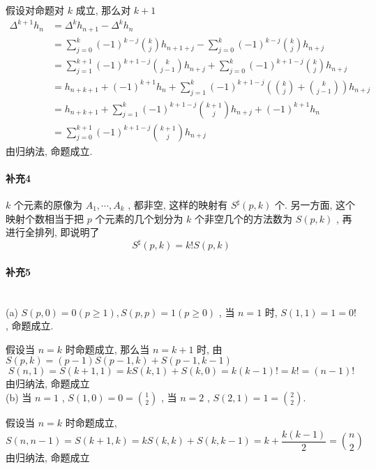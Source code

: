 \documentclass[a4paper, UTF8]{ctexart}				%
\begin{document}
        假设对命题对 $k$ 成立, 那么对 $k+1$
        \[
            \begin{split}
                \Delta^{k+1} h_n 
                & = \Delta^k h_{n+1} - \Delta^k h_n\\
                & = \sum^{k}_{j=0} (-1)^{k-j} {{k} \choose {j}} h_{n+1+j}
                    - \sum^{k}_{j=0} (-1)^{k-j} {{k} \choose {j}} h_{n+j}\\
                & = \sum^{k+1}_{j=1} (-1)^{k+1-j} {{k} \choose {j-1}} h_{n+j}
                    + \sum^{k}_{j=0} (-1)^{k+1-j} {{k} \choose {j}} h_{n+j}\\
                & = h_{n+k+1} + (-1)^{k+1} h_n
                    + \sum^{k}_{j=1} (-1)^{k+1-j} \left({{k} \choose {j}} + {{k} \choose {j-1}}\right) h_{n+j}\\
                & = h_{n+k+1} + \sum^{k}_{j=1} (-1)^{k+1-j} {{k+1} \choose {j}} h_{n+j} + (-1)^{k+1} h_n\\
                & = \sum^{k+1}_{j=0} (-1)^{k+1-j} {{k+1} \choose {j}} h_{n+j}
            \end{split}
        \]
         由归纳法, 命题成立.
    \paragraph{补充4}\quad 
        $k$ 个元素的原像为 $A_1, \cdots, A_k$ , 都非空, 这样的映射有 $S^{\sharp}(p,k)$ 个. 另一方面, 这个映射个数相当于把 $p$ 个元素的几个划分为 $k$ 个非空几个的方法数为 $S(p,k)$ , 再进行全排列, 即说明了 
        \[
            S^{\sharp}(p,k) = k!S(p,k)
        \]
        
    \paragraph{补充5}\quad \\
        (a) $S(p,0) = 0 (p \ge 1), S(p,p)=1 (p \ge 0)$ ,  当 $n=1$ 时, $S(1,1) = 1 = 0!$ , 命题成立. 
        
        假设当 $n =k$ 时命题成立, 那么当 $n=k+1$ 时, 由 $S(p,k) = (p-1)S(p-1,k) + S(p-1,k-1)$
        \[
           S(n,1) = S(k+1,1) = k S(k,1) + S(k,0) = k(k-1)! = k! = (n-1)!
        \]
        由归纳法, 命题成立\\
        (b) 当 $n=1$ , $S(1,0) = 0 = {{1} \choose {2}}$ , 当 $n=2$ , $S(2,1)=1={{2} \choose {2}}$.

        假设当 $n=k$ 时命题成立, 
        \[
            S(n,n-1) = S(k+1,k) = kS(k,k) + S(k,k-1) = k + \frac{k(k- 1)}{2} = {{n} \choose {2}}
        \]
        由归纳法, 命题成立        
\end{document}
